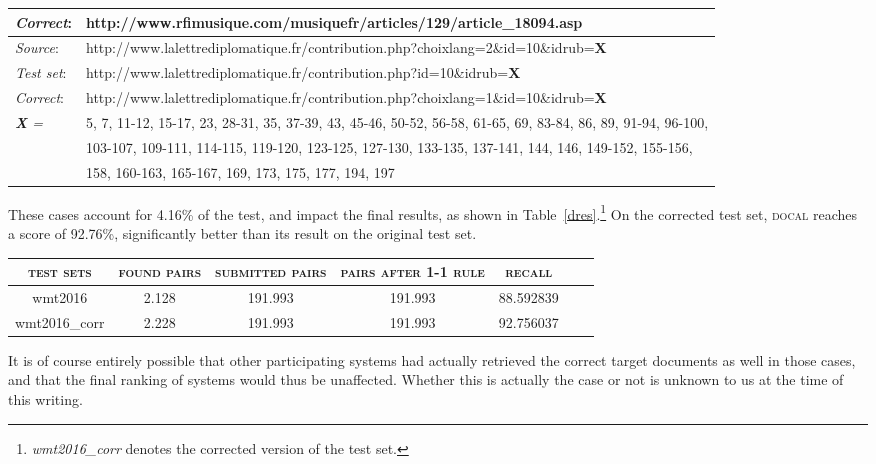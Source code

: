 \documentclass[11pt]{article}
\begin{document}
\begin{table*}
\begin{tabular}{| l | l |}
	\textit{Correct}: & http://www.rfimusique.com/musiquefr/articles/129/article\_18094.asp \\
	\hline		    	          					
	\hline		    	          
 	\textit{Source}: & http://www.lalettrediplomatique.fr/contribution.php?choixlang=2\&id=10\&idrub=\textbf{X} \\
 	\textit{Test set}: & http://www.lalettrediplomatique.fr/contribution.php?id=10\&idrub=\textbf{X} \\
	\textit{Correct}: & http://www.lalettrediplomatique.fr/contribution.php?choixlang=1\&id=10\&idrub=\textbf{X} \\
	\textit{\textbf{X} = } & 5, 7, 11-12, 15-17, 23, 28-31, 35, 37-39, 43, 45-46, 50-52, 56-58, 61-65, 69, 83-84, 86, 89, 91-94, 96-100,\\  
	& 103-107, 109-111, 114-115, 119-120, 123-125, 127-130, 133-135, 137-141, 144, 146, 149-152, 155-156, \\ 
	& 158, 160-163, 165-167, 169, 173, 175, 177, 194, 197\\
	\hline		    	          							
	\end{tabular}
	\caption{Identified likely errors in the test set}	 
	\label{err}		

\end{table*}

These cases account for 4.16\% of the test, and impact the final results, as shown in Table~\ref{dres}.\footnote{\textit{wmt2016\_corr} denotes the corrected version of the test set.} On the corrected test set, \textsc{docal} reaches a score of 92.76\%, significantly better than its result on the original test set.

\begin{table*}
	\small
	\centering
	\begin{tabular}{| c | c | c | c | c | c | c |}
	\hline	
		  \textsc{test sets}  & \textsc{found pairs} & \textsc{submitted pairs}  & \textsc{pairs after 1-1 rule}  &  \textsc{recall}   \\
	\hline		    	          
		wmt2016 	 &  2.128 & 191.993  & 191.993 & 88.592839  \\
	\hline		    	          
		wmt2016\_corr 	 &  2.228 & 191.993  & 191.993 & 92.756037  \\
	\hline		    	          					
	\end{tabular}
	\caption{\textsc{docal} results}	 
	\label{dres}		
\end{table*}

It is of course entirely possible that other participating systems had actually retrieved the correct target documents as well in those cases, and that the final ranking of systems would thus be unaffected. Whether this is actually the case or not is unknown to us at the time of this writing. 
\end{document}
